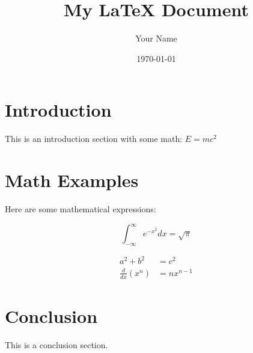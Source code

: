 \documentclass{article}
\begin{document}
\title{My LaTeX Document}
\author{Your Name}
\date{\today}
\maketitle

\section{Introduction}
This is an introduction section with some math: $E = mc^2$

\section{Math Examples}
Here are some mathematical expressions:

\begin{equation}
\int_{-\infty}^{\infty} e^{-x^2} dx = \sqrt{\pi}
\end{equation}

\begin{align}
a^2 + b^2 &= c^2 \\
\frac{d}{dx}(x^n) &= nx^{n-1}
\end{align}

\section{Conclusion}
This is a conclusion section.
\end{document}
